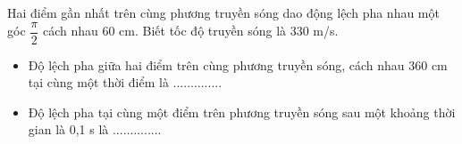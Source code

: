 \begin{vidu}%
Hai điểm gần nhất trên cùng phương truyền sóng dao động lệch pha nhau một góc $\dfrac{\pi}{2}$ cách nhau 60 cm. Biết tốc độ truyền sóng là 330 m/s. 
\begin{itemize}
\item[a)] Độ lệch pha giữa hai điểm trên cùng phương truyền sóng, cách nhau 360 cm tại cùng một thời điểm là ..............
\item[b)] Độ lệch pha tại cùng một điểm trên phương truyền sóng sau một khoảng thời gian là 0,1 s  là ..............
\end{itemize}
\end{vidu} 
